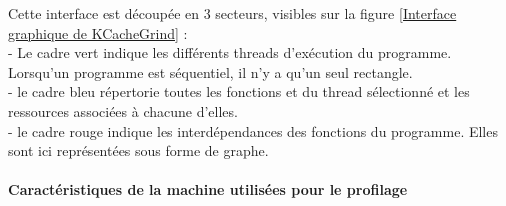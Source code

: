 \documentclass[10pt]{report}
\begin{document}
Cette interface est découpée en 3 secteurs, visibles sur la figure \ref{Interface graphique de KCacheGrind} : \\
- Le cadre vert indique les différents threads d'exécution du programme. Lorsqu'un programme est séquentiel, il n'y a qu'un seul rectangle.\\
- le cadre bleu répertorie toutes les fonctions et du thread sélectionné et les ressources associées à chacune d'elles.\\
- le cadre rouge indique les interdépendances des fonctions du programme. Elles sont ici représentées sous forme de graphe.\\ 

\paragraph{Caractéristiques de la machine utilisées pour le profilage}  ~\par 

 	
\newpage
\end{document}
